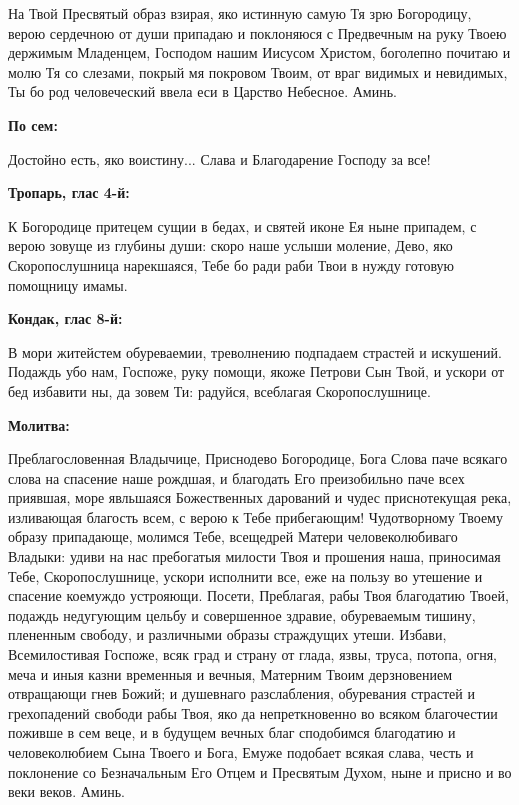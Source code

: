 На Твой Пресвятый образ взирая, яко истинную самую Тя зрю Богородицу, верою сердечною от души припадаю и поклоняюся с Предвечным на руку Твоею держимым Младенцем, Господом нашим Иисусом Христом, боголепно почитаю и молю Тя со слезами, покрый мя покровом Твоим, от враг видимых и невидимых, Ты бо род человеческий ввела еси в Царство Небесное. Аминь.


\medskip


\bfseries По сем:\normalfont{}\nopagebreak


Достойно есть, яко воистину... Слава и Благодарение Господу за все!
\nopagebreak\bigskip\bigskip\mychapterending

 


\bfseries Тропарь, глас 4-й:\normalfont{}\nopagebreak


К Богородице притецем сущии в бедах, и святей иконе Ея ныне припадем, с верою зовуще из глубины души: скоро наше услыши моление, Дево, яко Скоропослушница нарекшаяся, Тебе бо ради раби Твои в нужду готовую помощницу имамы.


\medskip


\bfseries Кондак, глас 8-й\normalfont{}:


В мори житейстем обуреваемии, треволнению подпадаем страстей и искушений. Подаждь убо нам, Госпоже, руку помощи, якоже Петрови Сын Твой, и ускори от бед избавити ны, да зовем Ти: радуйся, всеблагая Скоропослушнице.


\medskip


\bfseries Молитва\normalfont{}:


Преблагословенная Владычице, Приснодево Богородице, Бога Слова паче всякаго слова на спасение наше рождшая, и благодать Его преизобильно паче всех приявшая, море явльшаяся Божественных дарований и чудес приснотекущая река, изливающая благость всем, с верою к Тебе прибегающим! Чудотворному Твоему образу припадающе, молимся Тебе, всещедрей Матери человеколюбиваго Владыки: удиви на нас пребогатыя милости Твоя и прошения наша, приносимая Тебе, Скоропослушнице, ускори исполнити все, еже на пользу во утешение и спасение коемуждо устрояющи. Посети, Преблагая, рабы Твоя благодатию Твоей, подаждь недугующим цельбу и совершенное здравие, обуреваемым тишину, плененным свободу, и различными образы страждущих утеши. Избави, Всемилостивая Госпоже, всяк град и страну от глада, язвы, труса, потопа, огня, меча и иныя казни временныя и вечныя, Матерним Твоим дерзновением отвращающи гнев Божий; и душевнаго разслабления, обуревания страстей и грехопадений свободи рабы Твоя, яко да непреткновенно во всяком благочестии поживше в сем веце, и в будущем вечных благ сподобимся благодатию и человеколюбием Сына Твоего и Бога, Емуже подобает всякая слава, честь и поклонение со Безначальным Его Отцем и Пресвятым Духом, ныне и присно и во веки веков. Аминь.
\nopagebreak\bigskip\bigskip\mychapterending

